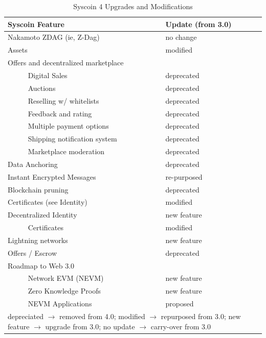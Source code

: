 \documentclass[peerreview]{ieeesyscoin}
\begin{document}
\begin{table}[h!]
\caption{Syscoin 4 Upgrades and Modifications}
\label{table:ugrades}
\setlength{\tabcolsep}{3pt}
\begin{tabular}{|p{135pt}|p{75pt}|}
\hline
Syscoin Feature & 
Update (from 3.0) \\

\hline
Nakamoto ZDAG (ie, Z-Dag) & no change \\
Assets & modified \\

Offers and decentralized marketplace &   \\
~~~~~ Digital Sales &  deprecated \\
~~~~~ Auctions &  deprecated \\
~~~~~ Reselling w/ whitelists &  deprecated \\
~~~~~ Feedback and rating &  deprecated \\
~~~~~ Multiple payment options &  deprecated \\
~~~~~ Shipping notification system &  deprecated \\
~~~~~ Marketplace moderation &  deprecated \\

Data Anchoring &  deprecated \\
Instant Encrypted Messages &  re-purposed \\
Blockchain pruning &  deprecated \\
Certificates (see Identity) &  modified \\
Decentralized Identity &  new feature \\
~~~~~ Certificates &  modified \\
Lightning networks &  new feature \\
Offers / Escrow &  deprecated \\
Roadmap to Web 3.0 & \\
~~~~~ Network EVM (NEVM) &  new feature  \\
~~~~~ Zero Knowledge Proofs &  new feature \\
~~~~~ NEVM Applications &  proposed \\

\hline
\multicolumn{2}{p{251pt}}{depreciated  $\rightarrow$ removed from 4.0; modified  $\rightarrow$ repurposed from 3.0; new feature  $\rightarrow$ upgrade from 3.0; no update $\rightarrow$ carry-over from 3.0}\\

\end{tabular}
\label{tab1}
\end{table}
\end{document}
